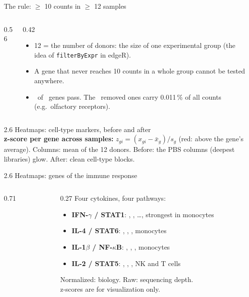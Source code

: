 \begin{frame}{The rule: $\geq$ 10 counts in $\geq$ 12 samples}
  \begin{columns}[c]
    \begin{column}{0.56\linewidth}
    \end{column}
    \begin{column}{0.42\linewidth}\small
      \begin{itemize}\setlength\itemsep{4pt}
        \item 12 = the number of donors: the size of one experimental group (the idea of \texttt{filterByExpr} in edgeR).
        \item A gene that never reaches 10 counts in a whole group cannot be tested anywhere.
        \item \alert{\numngenes\ of \numngenesraw\ genes} pass. The \numngenesremoved\ removed ones carry 0.011\,\% of all counts (e.g.\ olfactory receptors).
      \end{itemize}
    \end{column}
  \end{columns}
\end{frame}

\begin{frame}{2.6 Heatmaps: cell-type markers, before and after}
  \centering
  \vspace{-0.15cm}\\
  \scriptsize
  \textbf{z-score per gene across samples:} $z_{gi}=(x_{gi}-\bar x_g)/s_g$ (red: above the gene's average). Columns: mean of the 12 donors. \alert{Before}: the PBS columns (deepest libraries) glow. \alert{After}: clean cell-type blocks.
\end{frame}

\begin{frame}{2.6 Heatmaps: genes of the immune response}
  \begin{columns}[c]
    \begin{column}{0.71\linewidth}
    \end{column}
    \begin{column}{0.27\linewidth}\scriptsize
      Four cytokines, four pathways:
      \begin{itemize}\setlength\itemsep{3pt}
        \item \textbf{IFN-$\gamma$ / STAT1}: , , \ldots, strongest in monocytes
        \item \textbf{IL-4 / STAT6}: , , , monocytes
        \item \textbf{IL-1$\beta$ / NF-$\kappa$B}: , , , monocytes
        \item \textbf{IL-2 / STAT5}: , , , NK and T cells
      \end{itemize}
      \alert{Normalized: biology. Raw: sequencing depth.}\\[2pt]
      z-scores are for visualization only.
    \end{column}
  \end{columns}
\end{frame}

